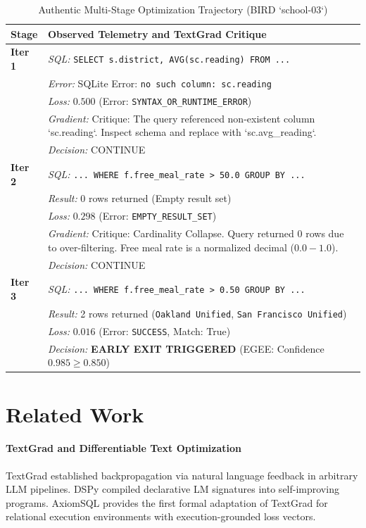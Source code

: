 \documentclass[conference]{IEEEtran}
\begin{document}
\begin{table}[h]
\centering
\caption{Authentic Multi-Stage Optimization Trajectory (BIRD `school-03`)}
\label{tab:trajectory}
\begin{tabular}{lp{6.2cm}}
\toprule
\textbf{Stage} & \textbf{Observed Telemetry and TextGrad Critique} \\
\midrule
\textbf{Iter 1} & \textit{SQL:} \texttt{SELECT s.district, AVG(sc.reading) FROM ...} \\
& \textit{Error:} SQLite Error: \texttt{no such column: sc.reading} \\
& \textit{Loss:} $0.500$ (Error: \texttt{SYNTAX\_OR\_RUNTIME\_ERROR}) \\
& \textit{Gradient:} Critique: The query referenced non-existent column `sc.reading`. Inspect schema and replace with `sc.avg_reading`. \\
& \textit{Decision:} CONTINUE \\
\midrule
\textbf{Iter 2} & \textit{SQL:} \texttt{... WHERE f.free\_meal\_rate > 50.0 GROUP BY ...} \\
& \textit{Result:} 0 rows returned (Empty result set) \\
& \textit{Loss:} $0.298$ (Error: \texttt{EMPTY\_RESULT\_SET}) \\
& \textit{Gradient:} Critique: Cardinality Collapse. Query returned 0 rows due to over-filtering. Free meal rate is a normalized decimal ($0.0-1.0$). \\
& \textit{Decision:} CONTINUE \\
\midrule
\textbf{Iter 3} & \textit{SQL:} \texttt{... WHERE f.free\_meal\_rate > 0.50 GROUP BY ...} \\
& \textit{Result:} 2 rows returned (\texttt{Oakland Unified}, \texttt{San Francisco Unified}) \\
& \textit{Loss:} $0.016$ (Error: \texttt{SUCCESS}, Match: True) \\
& \textit{Decision:} \textbf{EARLY EXIT TRIGGERED} (EGEE: Confidence $0.985 \ge 0.850$) \\
\bottomrule
\end{tabular}
\end{table}

\section{Related Work}

\paragraph{TextGrad and Differentiable Text Optimization} TextGrad \cite{yuksekgonul2024textgrad} established backpropagation via natural language feedback in arbitrary LLM pipelines. DSPy \cite{khattab2023dspy} compiled declarative LM signatures into self-improving programs. AxiomSQL provides the first formal adaptation of TextGrad for relational execution environments with execution-grounded loss vectors.
\end{document}
